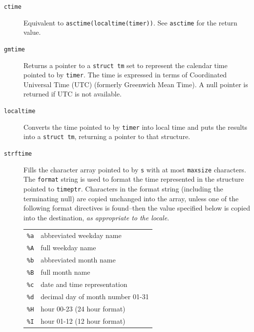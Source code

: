 \begin{description}
   

   \item[\texttt{ctime}] Equivalent to \texttt{asctime(localtime(timer))}.  See
    \texttt{asctime} for the return value.

   \item[\texttt{gmtime}] Returns a pointer to a \texttt{struct tm}  set  to  represent  the
    calendar time pointed to by \texttt{timer}.  The time is expressed in
    terms of Coordinated Universal  Time  (UTC)  (formerly Greenwich  Mean
    Time).  A null pointer is returned if UTC is not available.

   \item[\texttt{localtime}] Converts the time pointed to by \texttt{timer} into local time and
    puts the results into a \texttt{struct tm}, returning a pointer to that
    structure.

   \item[\texttt{strftime}] 
    Fills the character array pointed to by \texttt{s}  with  at  most
     \texttt{maxsize}  characters.  The \texttt{format} string is used
     to format the time represented in the structure pointed to
     \texttt{timeptr}.  Characters   in   the   format   string
     (including  the terminating null) are copied unchanged  into  the  array,
     unless  one of the following format directives is found--then the
     value  specified  below  is  copied  into  the destination, \textit{as
     appropriate to the locale}.


    \begin{tabular}{lp{\textwidth}}
      \texttt{\%a} & abbreviated weekday name
     \\

      \texttt{\%A} & full weekday name
     \\

      \texttt{\%b} & abbreviated month name
     \\

      \texttt{\%B} & full month name
     \\

      \texttt{\%c} & date and time representation
     \\

      \texttt{\%d} & decimal day of month number 01-31
     \\

      \texttt{\%H} & hour 00-23 (24 hour format)
     \\

      \texttt{\%I} & hour 01-12 (12 hour format)
     \\


\end{tabular}
\end{description}
